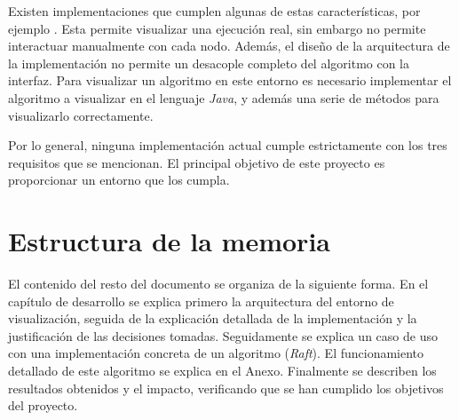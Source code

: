 Existen implementaciones que cumplen algunas de estas características, por ejemplo \cite{MOSES200497}. Esta permite visualizar una ejecución real, sin embargo no permite interactuar manualmente con cada nodo. Además, el diseño de la arquitectura de la implementación no permite un desacople completo del algoritmo con la interfaz. Para visualizar un algoritmo en este entorno es necesario implementar el algoritmo a visualizar en el lenguaje \textit{Java}, y además una serie de métodos para visualizarlo correctamente.

Por lo general, ninguna implementación actual cumple estrictamente con los tres requisitos que se mencionan. El principal objetivo de este proyecto es proporcionar un entorno que los cumpla.


\section{Estructura de la memoria}

El contenido del resto del documento se organiza de la siguiente forma. En el capítulo de desarrollo se explica primero la arquitectura del entorno de visualización, seguida de la explicación detallada de la implementación y la justificación de las decisiones tomadas. Seguidamente se explica un caso de uso con una implementación concreta de un algoritmo (\textit{Raft}). El funcionamiento detallado de este algoritmo se explica en el Anexo. Finalmente se describen los resultados obtenidos y el impacto, verificando que se han cumplido los objetivos del proyecto.



